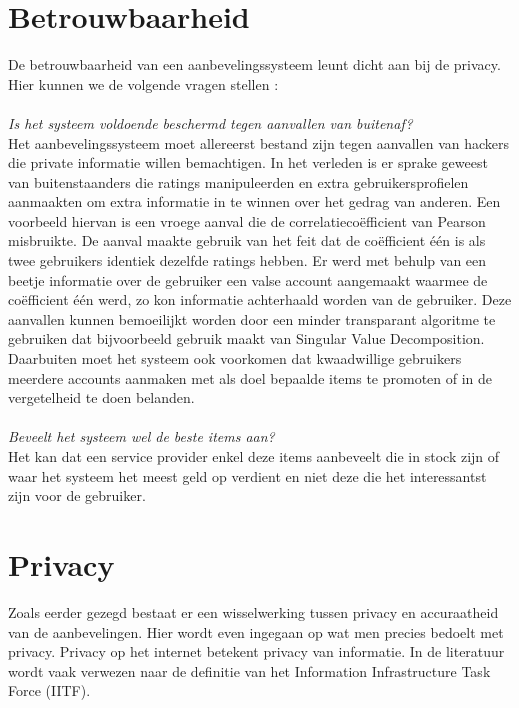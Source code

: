 \section{Betrouwbaarheid}
De betrouwbaarheid van een aanbevelingssysteem leunt dicht aan bij de privacy. Hier kunnen we de volgende vragen stellen :\\\\ \emph{Is het systeem voldoende beschermd tegen aanvallen van buitenaf?}\\
 Het aanbevelingssysteem moet allereerst bestand zijn tegen aanvallen van hackers die private informatie willen bemachtigen. In het verleden is er sprake geweest van buitenstaanders die ratings manipuleerden en extra gebruikersprofielen aanmaakten om extra informatie in te winnen over het gedrag van anderen. Een voorbeeld hiervan is een vroege aanval die de correlatieco\"efficient van Pearson misbruikte. De aanval maakte gebruik van het feit dat de co\"efficient \'e\'en is als twee gebruikers identiek dezelfde ratings hebben. Er werd met behulp van een beetje informatie over de gebruiker een valse account aangemaakt waarmee de co\"efficient \'e\'en werd, zo kon informatie achterhaald worden van de gebruiker. Deze aanvallen kunnen bemoeilijkt worden door een minder transparant algoritme te gebruiken dat bijvoorbeeld gebruik maakt van Singular Value Decomposition. \\Daarbuiten moet het systeem ook voorkomen dat kwaadwillige gebruikers meerdere accounts aanmaken met als doel bepaalde items te promoten of in de vergetelheid te doen belanden. \\\\ \emph{ Beveelt het systeem wel de beste items  aan?}\\ Het kan dat een service provider enkel deze items aanbeveelt die in stock zijn of waar het systeem het meest geld op verdient en niet deze die het interessantst zijn voor de gebruiker. 
  
 
\section{Privacy}
\label{sec:privacy}
Zoals eerder gezegd bestaat er een wisselwerking tussen privacy en accuraatheid van de aanbevelingen. Hier wordt even ingegaan op wat men precies bedoelt met privacy. Privacy op het internet betekent privacy van informatie. In de literatuur wordt vaak verwezen naar de definitie van het Information Infrastructure Task Force (IITF).


